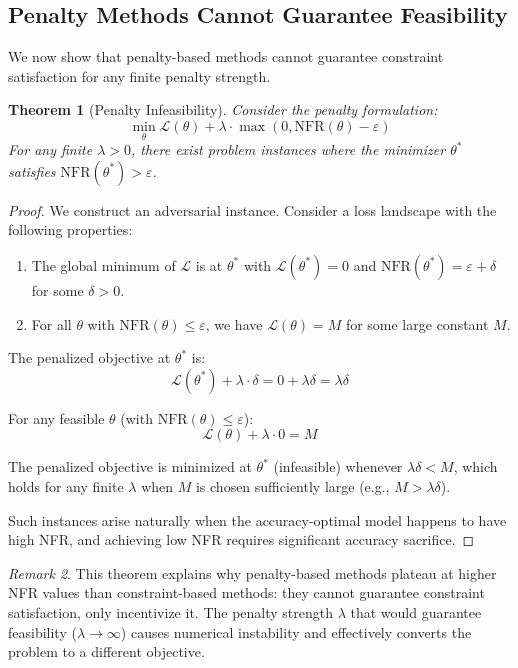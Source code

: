 \documentclass[12pt, letterpaper]{article}
\newtheorem{theorem}{Theorem}[section]
\theoremstyle{remark}
\newtheorem{remark}[theorem]{Remark}
\begin{document}
\subsection{Penalty Methods Cannot Guarantee Feasibility}

We now show that penalty-based methods cannot guarantee constraint satisfaction for any finite penalty strength.

\begin{theorem}[Penalty Infeasibility]\label{thm:penalty-infeasible}
Consider the penalty formulation:
\[
\min_\theta \mathcal{L}(\theta) + \lambda \cdot \max(0, \mathrm{NFR}(\theta) - \varepsilon)
\]
For any finite $\lambda > 0$, there exist problem instances where the minimizer $\theta^*$ satisfies $\mathrm{NFR}(\theta^*) > \varepsilon$.
\end{theorem}

\begin{proof}
We construct an adversarial instance. Consider a loss landscape with the following properties:
\begin{enumerate}
\item The global minimum of $\mathcal{L}$ is at $\theta^*$ with $\mathcal{L}(\theta^*) = 0$ and $\mathrm{NFR}(\theta^*) = \varepsilon + \delta$ for some $\delta > 0$.
\item For all $\theta$ with $\mathrm{NFR}(\theta) \leq \varepsilon$, we have $\mathcal{L}(\theta) = M$ for some large constant $M$.
\end{enumerate}

The penalized objective at $\theta^*$ is:
\[
\mathcal{L}(\theta^*) + \lambda \cdot \delta = 0 + \lambda \delta = \lambda \delta
\]

For any feasible $\theta$ (with $\mathrm{NFR}(\theta) \leq \varepsilon$):
\[
\mathcal{L}(\theta) + \lambda \cdot 0 = M
\]

The penalized objective is minimized at $\theta^*$ (infeasible) whenever $\lambda \delta < M$, which holds for any finite $\lambda$ when $M$ is chosen sufficiently large (e.g., $M > \lambda \delta$).

Such instances arise naturally when the accuracy-optimal model happens to have high NFR, and achieving low NFR requires significant accuracy sacrifice.
\end{proof}

\begin{remark}
This theorem explains why penalty-based methods plateau at higher NFR values than constraint-based methods: they cannot guarantee constraint satisfaction, only incentivize it. The penalty strength $\lambda$ that would guarantee feasibility ($\lambda \to \infty$) causes numerical instability and effectively converts the problem to a different objective.
\end{remark}
\end{document}
